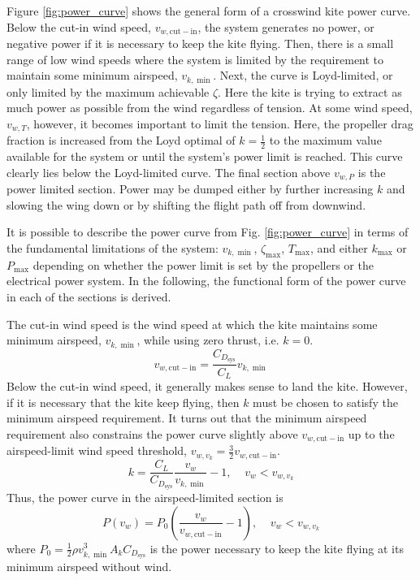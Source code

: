 \documentclass[11pt]{amsart}
\newcommand{\cutin}{\mathrm{cut-in}}
\newcommand{\kite}{k}
\newcommand{\sys}{\mathrm{sys}}
\newcommand{\wind}{w}
\begin{document}
Figure \ref{fig:power_curve} shows the general form of a crosswind
kite power curve.  Below the cut-in wind speed, $v_{\wind,\cutin}$,
the system generates no power, or negative power if it is necessary to
keep the kite flying.  Then, there is a small range of low wind speeds
where the system is limited by the requirement to maintain some
minimum airspeed, $v_{\kite,\min}$.  Next, the curve is Loyd-limited,
or only limited by the maximum achievable $\zeta$.  Here the kite is
trying to extract as much power as possible from the wind regardless
of tension.  At some wind speed, $v_{\wind,T}$, however, it becomes
important to limit the tension.  Here, the propeller drag fraction is
increased from the Loyd optimal of $k = \frac{1}{2}$ to the maximum
value available for the system or until the system's power limit is
reached.  This curve clearly lies below the Loyd-limited curve.  The
final section above $v_{\wind,P}$ is the power limited section.  Power
may be dumped either by further increasing $k$ and slowing the wing
down or by shifting the flight path off from downwind.

It is possible to describe the power curve from
Fig. \ref{fig:power_curve} in terms of the fundamental limitations of
the system: $v_{\kite,\min}$, $\zeta_{\max}$, $T_{\max}$, and either
$k_{\max}$ or $P_{\max}$ depending on whether the power limit is set
by the propellers or the electrical power system.  In the following,
the functional form of the power curve in each of the sections is
derived.

The cut-in wind speed is the wind speed at which the kite maintains
some minimum airspeed, $v_{\kite,\min}$, while using zero thrust,
i.e. $k=0$.
%
\begin{equation}
v_{\wind,\cutin} = \frac{C_{D_{\sys}}}{C_L} v_{\kite,\min}
\end{equation}
%
Below the cut-in wind speed, it generally makes sense to land the
kite.  However, if it is necessary that the kite keep flying, then $k$
must be chosen to satisfy the minimum airspeed requirement.  It turns
out that the minimum airspeed requirement also constrains the power
curve slightly above $v_{\wind,\cutin}$ up to the airspeed-limit wind
speed threshold, $v_{\wind,v_{\kite}} = \frac{3}{2} v_{\wind,\cutin}$.
%
\begin{equation}
k = \frac{C_L}{C_{D_{\sys}}} \frac{v_{\wind}}{v_{\kite,\min}} - 1,\;\;\;\;
v_{\wind} < v_{\wind,v_{\kite}}
\end{equation}
%
Thus, the power curve in the airspeed-limited section is
%
\begin{equation}
P(v_{\wind}) = P_0 \left( \frac{v_{\wind}}{v_{\wind,\cutin}} - 1 \right),\;\;\;\;
v_{\wind} < v_{\wind,v_{\kite}}
\end{equation}
%
where $P_0 = \frac{1}{2} \rho v_{\kite,\min}^3 A_{\kite} C_{D_{\sys}}$
is the power necessary to keep the kite flying at its minimum airspeed
without wind.
\end{document}
